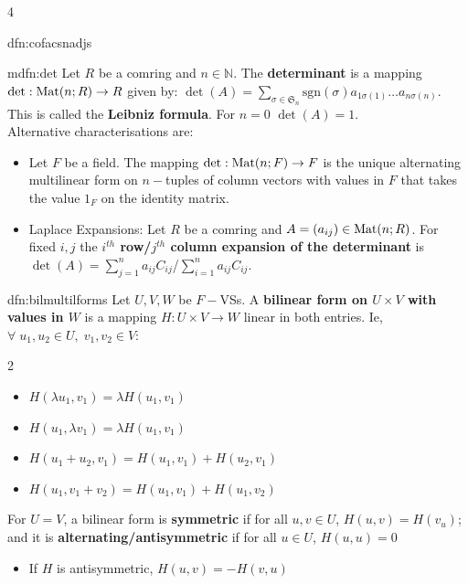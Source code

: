 \documentclass[landscape, 8pt]{extarticle}
\begin{document}
\begin{multicols*}{4}
\begin{dfn}{dfn:cofacsnadjs}{ }
		\end{dfn}
		
		
		\begin{mdfn}{mdfn:det}{ }
			Let $R$ be a comring and $n \in \mathbb{N}$. The \textbf{determinant} is a mapping $\det : \operatorname{Mat}(n; R) \to R$ given by: $\det(A) = \sum_{\sigma \in \mathfrak{S}_n} \text{sgn}(\sigma)a_{1 \sigma(1)} \dots a_{n \sigma(n)}$. This is called the \textbf{Leibniz formula}. For $n=0$ $\det(A) = 1$. \\
			Alternative characterisations are:
			\begin{itemize}
				\item Let $F$ be a field. The mapping $\det : \operatorname{Mat}(n; F) \to F$ is the unique alternating multilinear form on $n-$tuples of column vectors with values in $F$ that takes the value $1_F$ on the identity matrix.
				\item Laplace Expansions: Let $R$ be a comring and $A = (a_{ij}) \in \operatorname{Mat}(n; R)$. For fixed $i, j$ the \textbf{$i^{th}$ row/$j^{th}$ column expansion of the determinant} is $\det(A) = \sum_{j=1}^{n}a_{ij}C_{ij}$/$\sum_{i=1}^{n}a_{ij}C_{ij}$.
			\end{itemize}
			
		\end{mdfn}
		
		
		\begin{dfn}{dfn:bilmultilforms}{ }
			Let $U, V, W$ be $F-$VSs. A \textbf{bilinear form on $U \times V$ with values in $W$} is a mapping $H: U\times V \to W$ linear in both entries. Ie, $\forall \; u_1, u_2 \in U, \; v_1, v_2 \in V$:\\
			\vspace*{-5ex}
			{\setlength{\columnsep}{-5em}
			\begin{multicols*}{2}
				\begin{itemize}
					\item $H(\lambda u_1, v_1) = \lambda H(u_1, v_1)$
					\item $H(u_1, \lambda v_1) = \lambda H(u_1, v_1)$
					\columnbreak
					\item $H(u_1 + u_2, v_1) = H(u_1, v_1) + H(u_2, v_1)$
					\item $H(u_1, v_1 + v_2) = H(u_1, v_1) + H(u_1, v_2)$
				\end{itemize}
			\end{multicols*}
			}
			\vspace*{-4ex}
			For $U = V$, a bilinear form is \textbf{symmetric} if for all $u, v \in U$, $H(u, v) = H(v_u)$; and it is \textbf{alternating/antisymmetric} if for all $u \in U$, $H(u, u) = 0$
			\begin{itemize}
				\item If $H$ is antisymmetric, $H(u, v) = -H(v, u)$
			\end{itemize}
			

\end{dfn}
\end{multicols*}
\end{document}
